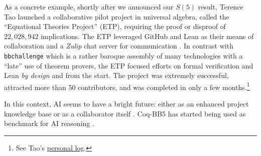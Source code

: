 \documentclass[a4paper,british]{article}
\theoremstyle{definition} %
\numberwithin{equation}{section}
\theoremstyle{definition} %
\newcommand{\CoqBB}{Coq-BB5\xspace}
\begin{document}
As a concrete example, shortly after we announced our $S(5)$ result, Terence Tao launched a collaborative pilot project in universal algebra, called the ``Equational Theories Project'' (ETP), requiring the proof or disproof of $22,028,942$ implications. The ETP leveraged GitHub and Lean as their means of collaboration and a \textit{Zulip} chat server for communication \cite{TaoBlog, ETPGithub, ETPpaper}. In contrast with \texttt{bbchallenge} which is a rather baroque assembly of many technologies with a ``late'' use of theorem provers, the ETP focused efforts on formal verification and Lean \textit{by design} and from the start. The project was extremely successful, attracted more than 50 contributors, and was completed in only a few months.\footnote{See Tao's \href{https://github.com/teorth/equational_theories/wiki/Terence-Tao's-personal-log}{personal log}.}

In this context, AI seems to have a bright future: either as an enhanced project knowledge base or as a collaborator itself \cite{Trinh2024, wu2024internlm25stepproveradvancingautomatedtheorem}. \CoqBB has started being used as  benchmark for AI reasoning \cite{teodorescu2024nlir}.






\end{document}
